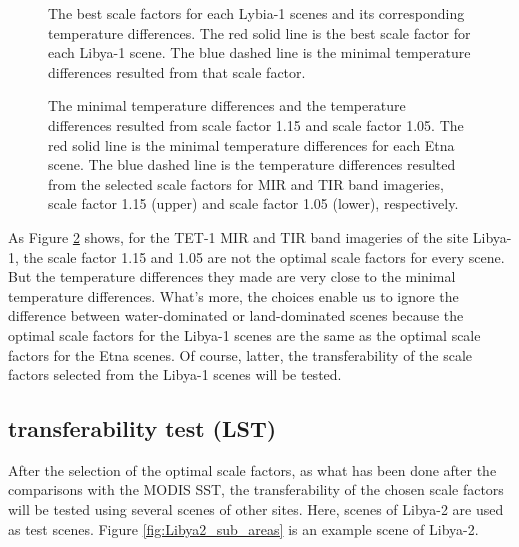 \begin{figure}[!htbp]
\centering
{}
\hspace{0.5in}
\caption{The best scale factors for each Lybia-1 scenes and its corresponding temperature differences. The red solid line is the best scale factor for each Libya-1 scene. The blue dashed line is the minimal temperature differences resulted from that scale factor.}
\label{fig:Libya-1_bsc_mir_tir}
\end{figure}

\begin{figure}[!htbp]
\centering
{}
\hspace{0.5in}
\caption{The minimal temperature differences and the temperature differences resulted from scale factor 1.15 and scale factor 1.05. The red solid line is the minimal temperature differences for each Etna scene. The blue dashed line is the temperature differences resulted from the selected scale factors for MIR and TIR band imageries, scale factor 1.15 (upper) and scale factor 1.05 (lower), respectively.}
\label{fig:Lybia-1_bsc&temCom}
\end{figure}

\noindent As Figure \ref{fig:Lybia-1_bsc&temCom} shows, for the TET-1 MIR and TIR band imageries of the site Libya-1, the scale factor 1.15 and 1.05 are not the optimal scale factors for every scene. But the temperature differences they made are very close to the minimal temperature differences. What's more, the choices enable us to ignore the difference between water-dominated or land-dominated scenes because the optimal scale factors for the Libya-1 scenes are the same as the optimal scale factors for the Etna scenes. Of course, latter, the transferability of the scale factors selected from the Libya-1 scenes will be tested.\\


\subsection{transferability test (LST)}
After the selection of the optimal scale factors, as what has been done after the comparisons with the MODIS SST, the transferability of  the chosen scale factors will be tested using several scenes of other sites. Here, scenes of Libya-2 are used as test scenes. Figure \ref{fig:Libya2_sub_areas} is an example scene of Libya-2.\\

